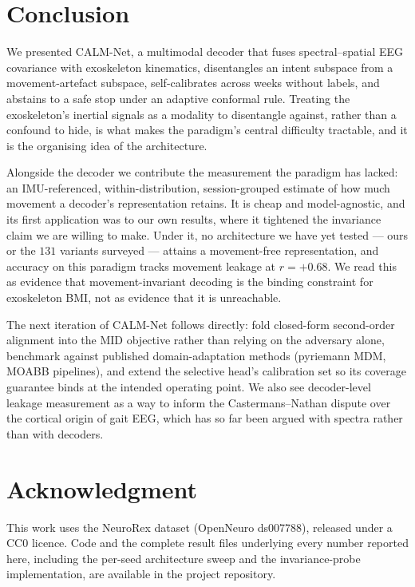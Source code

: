 \documentclass[conference]{IEEEtran}
\begin{document}
\section{Conclusion}
We presented CALM-Net, a multimodal decoder that fuses spectral--spatial EEG covariance
with exoskeleton kinematics, disentangles an intent subspace from a movement-artefact
subspace, self-calibrates across weeks without labels, and abstains to a safe stop under
an adaptive conformal rule. Treating the exoskeleton's inertial signals as a modality to
disentangle against, rather than a confound to hide, is what makes the paradigm's central
difficulty tractable, and it is the organising idea of the architecture.

Alongside the decoder we contribute the measurement the paradigm has lacked: an
IMU-referenced, within-distribution, session-grouped estimate of how much movement a
decoder's representation retains. It is cheap and model-agnostic, and its first
application was to our own results, where it tightened the invariance claim we are
willing to make. Under it, no architecture we have yet tested --- ours or the $131$
variants surveyed --- attains a movement-free representation, and accuracy on this
paradigm tracks movement leakage at $r = +0.68$. We read this as evidence that
movement-invariant decoding is the binding constraint for exoskeleton BMI, not as
evidence that it is unreachable.

The next iteration of CALM-Net follows directly: fold closed-form second-order alignment
into the MID objective rather than relying on the adversary alone, benchmark against
published domain-adaptation methods (pyriemann MDM, MOABB pipelines), and extend the
selective head's calibration set so its coverage guarantee binds at the intended
operating point. We also see decoder-level leakage measurement as a way to inform the
Castermans--Nathan dispute over the cortical origin of gait EEG, which has so far been
argued with spectra rather than with decoders.

\section*{Acknowledgment}
This work uses the NeuroRex dataset (OpenNeuro ds007788), released under a CC0
licence. Code and the complete result files underlying every number reported
here, including the per-seed architecture sweep and the invariance-probe
implementation, are available in the project repository.
\end{document}
